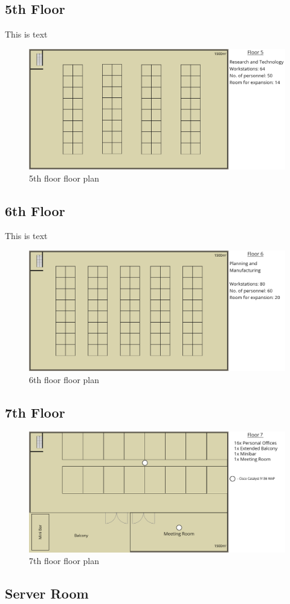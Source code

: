 \subsection{5th Floor}
This is text
\begin{figure}[ht!]
    \includegraphics[width=15cm]{Figures/5th-Floor.png}
    \caption{5th floor floor plan}
    \label{fig:5th_floor}
\end{figure}
\subsection{6th Floor}
This is text
\begin{figure}[ht!]
    \includegraphics[width=15cm]{Figures/6th-Floor.png}
    \caption{6th floor floor plan}
    \label{fig:6th_floor}
\end{figure}
\subsection{7th Floor}
\begin{figure}[ht!]
    \includegraphics[width=15cm]{Figures/7th-floor.png}
    \caption{7th floor floor plan}
    \label{fig:7th_floor}
\end{figure}
\subsection{Server Room}